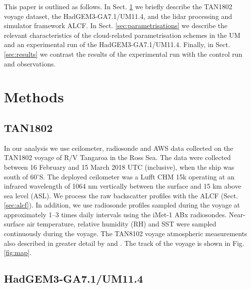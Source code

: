 This paper is outlined as follows.
In Sect. \ref{sec:methods} we briefly describe the TAN1802 voyage dataset,
the HadGEM3-GA7.1/UM11.4, and the lidar processing and simulator framework ALCF.
In Sect. \ref{sec:parametrisations} we describe the
relevant characteristics of the cloud-related parametrisation schemes in the UM
and an experimental run of the HadGEM3-GA7.1/UM11.4. Finally, in Sect.
\ref{sec:results} we contrast the results
of the experimental run with the control run and observations.

\section{Methods}
\label{sec:methods}

\subsection{TAN1802}

In our analysis we use ceilometer, radiosonde and AWS data collected on the TAN1802 voyage
of R/V Tangaroa in the Ross Sea. The data were collected
between 16 February and 15 March 2018 UTC (inclusive), when the ship was south of
60$^\circ$S. The deployed ceilometer was a Lufft CHM 15k operating at an
infrared wavelength of 1064 nm vertically between the surface and 15 km above
sea level (ASL). We process the raw backscatter profiles with
the ALCF (Sect. \ref{sec:alcf}). In addition, we use radiosonde profiles
sampled during the voyage at approximately 1--3 times daily intervals
using the iMet-1 ABx radiosondes. Near-surface air temperature, relative humidity (RH) and SST were
sampled continuously during the voyage. The TAN8102
voyage atmospheric measurements also described in greater detail by
\cite{kuma2019} and \cite{hartery2020}. The track of the voyage
is shown in Fig. \ref{fig:map}.

\subsection{HadGEM3-GA7.1/UM11.4}

